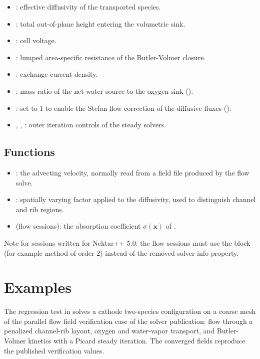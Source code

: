 \begin{itemize}
\item {}: effective diffusivity of the transported
species.
\item {}: total out-of-plane height entering the
volumetric sink.
\item {}: cell voltage.
\item {}: lumped area-specific resistance of the
Butler-Volmer closure.
\item {}: exchange current density.
\item {}: mass ratio of the net water source
to the oxygen sink ().
\item {}: set to 1 to enable the Stefan flow
correction of the diffusive fluxes ().
\item {}, , :
outer iteration controls of the steady solvers.
\end{itemize}

\subsection{Functions}

\begin{itemize}
\item {}: the advecting velocity, normally
read from a field file produced by the flow solve.
\item {}: spatially varying factor applied to
the diffusivity, used to distinguish channel and rib regions.
\item {} (flow sessions): the absorption
coefficient $\sigma(\mathbf{x})$ of
.
\end{itemize}

Note for sessions written for Nektar++ 5.0: the flow sessions must
use the  block (for example method
 of order 2) instead of the removed
 solver-info property.

\section{Examples}

The regression test in  solves a
cathode two-species configuration on a coarse mesh of the parallel
flow field verification case of the solver publication: flow through
a penalized channel-rib layout, oxygen and water-vapor transport,
and Butler-Volmer kinetics with a Picard steady iteration. The
converged fields reproduce the published verification values.
